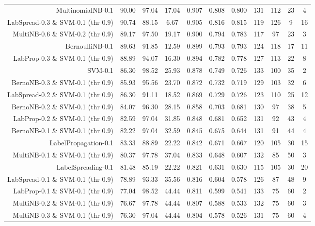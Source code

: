\begin{table}[!htb]
\begin{tabular}{r|c|c|c|c|c|c|c|c|c|c}
MultinomialNB-0.1 & 90.00 & 97.04 & 17.04 & 0.907 & 0.808 & 0.800 & 131 & 112 & 23 & 4 \\ 
LabSpread-0.3 \& SVM-0.1 (thr 0.9) & 90.74 & 88.15 & 6.67 & 0.905 & 0.816 & 0.815 & 119 & 126 & 9 & 16 \\ 
MultiNB-0.6 \& SVM-0.2 (thr 0.9) & 89.17 & 97.50 & 19.17 & 0.900 & 0.794 & 0.783 & 117 & 97 & 23 & 3 \\ 
BernoulliNB-0.1 & 89.63 & 91.85 & 12.59 & 0.899 & 0.793 & 0.793 & 124 & 118 & 17 & 11 \\ 
LabProp-0.3 \& SVM-0.1 (thr 0.9) & 88.89 & 94.07 & 16.30 & 0.894 & 0.782 & 0.778 & 127 & 113 & 22 & 8 \\ 
SVM-0.1 & 86.30 & 98.52 & 25.93 & 0.878 & 0.749 & 0.726 & 133 & 100 & 35 & 2 \\ 
BernoNB-0.3 \& SVM-0.1 (thr 0.9) & 85.93 & 95.56 & 23.70 & 0.872 & 0.732 & 0.719 & 129 & 103 & 32 & 6 \\ 
LabSpread-0.2 \& SVM-0.1 (thr 0.9) & 86.30 & 91.11 & 18.52 & 0.869 & 0.729 & 0.726 & 123 & 110 & 25 & 12 \\ 
BernoNB-0.2 \& SVM-0.1 (thr 0.9) & 84.07 & 96.30 & 28.15 & 0.858 & 0.703 & 0.681 & 130 & 97 & 38 & 5 \\ 
LabProp-0.2 \& SVM-0.1 (thr 0.9) & 82.59 & 97.04 & 31.85 & 0.848 & 0.681 & 0.652 & 131 & 92 & 43 & 4 \\ 
BernoNB-0.1 \& SVM-0.1 (thr 0.9) & 82.22 & 97.04 & 32.59 & 0.845 & 0.675 & 0.644 & 131 & 91 & 44 & 4 \\ 
LabelPropagation-0.1 & 83.33 & 88.89 & 22.22 & 0.842 & 0.671 & 0.667 & 120 & 105 & 30 & 15 \\ 
MultiNB-0.1 \& SVM-0.1 (thr 0.9) & 80.37 & 97.78 & 37.04 & 0.833 & 0.648 & 0.607 & 132 & 85 & 50 & 3 \\ 
LabelSpreading-0.1 & 81.48 & 85.19 & 22.22 & 0.821 & 0.631 & 0.630 & 115 & 105 & 30 & 20 \\ 
LabSpread-0.1 \& SVM-0.1 (thr 0.9) & 78.89 & 93.33 & 35.56 & 0.816 & 0.604 & 0.578 & 126 & 87 & 48 & 9 \\ 
LabProp-0.1 \& SVM-0.1 (thr 0.9) & 77.04 & 98.52 & 44.44 & 0.811 & 0.599 & 0.541 & 133 & 75 & 60 & 2 \\ 
MultiNB-0.2 \& SVM-0.1 (thr 0.9) & 76.67 & 97.78 & 44.44 & 0.807 & 0.588 & 0.533 & 132 & 75 & 60 & 3 \\ 
MultiNB-0.3 \& SVM-0.1 (thr 0.9) & 76.30 & 97.04 & 44.44 & 0.804 & 0.578 & 0.526 & 131 & 75 & 60 & 4 \\ 
\hline\hline
\end{tabular}
\end{table}
